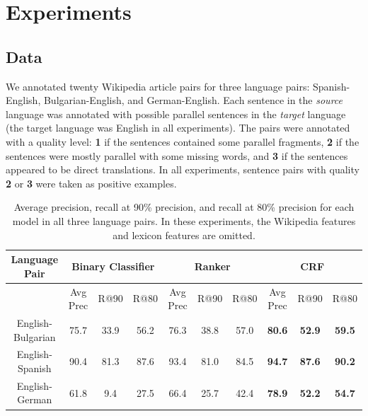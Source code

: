 \section{Experiments}
\label{sec:exp}

\subsection{Data}
We annotated twenty Wikipedia article pairs for three language pairs: Spanish-English,
Bulgarian-English, and German-English.
Each sentence in the {\em source} language was annotated with
possible parallel sentences in the {\em target} language (the target language was
English in all experiments).  The pairs were annotated with a quality level:
{\bf 1} if the sentences contained some parallel fragments, {\bf 2} if the sentences
were mostly parallel with some missing words, and {\bf 3} if the sentences appeared to be direct
translations.  In all experiments, sentence pairs with quality {\bf 2} or {\bf 3} were
taken as positive examples. 

\begin{table}[ht]
\tiny
\begin{center}
\begin{tabular}{|c||c|c|c||c|c|c||c|c|c|}
\hline
Language Pair     & \multicolumn{3}{|c||}{Binary Classifier} & \multicolumn{3}{|c||}{Ranker} & \multicolumn{3}{|c|}{CRF} \\
\hline
                  & Avg Prec & R@90 & R@80
                  & Avg Prec & R@90 & R@80
                  & Avg Prec & R@90 & R@80 \\
\hline
English-Bulgarian & 75.7  & 33.9  & 56.2    & 76.3  & 38.8  & 57.0    & {\bf 80.6}  & {\bf 52.9}  & {\bf 59.5} \\
English-Spanish   & 90.4  & 81.3  & 87.6    & 93.4  & 81.0  & 84.5    & {\bf 94.7}  & {\bf 87.6}  & {\bf 90.2} \\
English-German    & 61.8  &  9.4  & 27.5    & 66.4  & 25.7  & 42.4    & {\bf 78.9}  & {\bf 52.2}  & {\bf 54.7} \\
\hline
\end{tabular}
\end{center}
\caption{Average precision, recall at 90\% precision, and recall at 80\%
precision for each model in all three language pairs.  In these experiments, the
Wikipedia features and lexicon features are omitted.}
\label{table:modelcompare}
\end{table}

